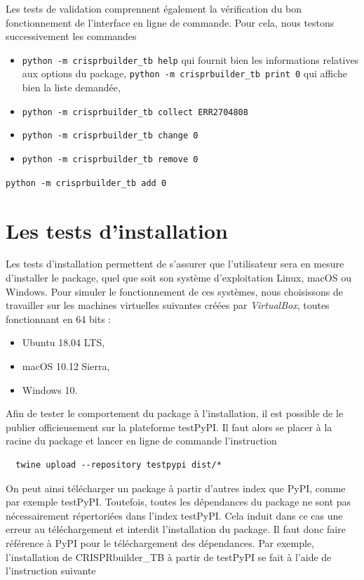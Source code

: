 \documentclass[twoside,a4paper,11pt,frenchb,openany]{report}
\begin{document}
Les tests de validation comprennent également la vérification du bon fonctionnement de l'interface en ligne de commande. Pour cela, nous testons successivement les commandes

\begin{itemize}
\item \texttt{python -m crisprbuilder\_tb \textemdash \textemdash help} qui fournit bien les informations relatives aux options du package,
\texttt{python -m crisprbuilder\_tb \textemdash \textemdash print 0} qui affiche bien la liste demandée,
\item \texttt{python -m crisprbuilder\_tb \textemdash \textemdash collect ERR2704808}
\item \texttt{python -m crisprbuilder\_tb \textemdash \textemdash change 0}
\item \texttt{python -m crisprbuilder\_tb \textemdash \textemdash remove 0}
\end{itemize}
\texttt{python -m crisprbuilder\_tb \textemdash \textemdash add 0}






\section{Les tests d'installation}

Les tests d'installation permettent de s'assurer que l'utilisateur sera en mesure d'installer le package, quel que soit son système d'exploitation Linux, macOS ou Windows. Pour simuler le fonctionnement de ces systèmes, nous choisissons de travailler sur les machines virtuelles suivantes créées par \textit{VirtualBox}, toutes fonctionnant en 64 bits : 
\begin{itemize}
\item Ubuntu 18.04 LTS, 
\item macOS 10.12 Sierra, 
\item Windows 10.
\end{itemize}

Afin de tester le comportement du package à l'installation, il est possible de le publier officieusement sur la plateforme testPyPI. Il faut alors se placer à la racine du package et lancer en ligne de commande l'instruction
\begin{verbatim}  twine upload --repository testpypi dist/*\end{verbatim}

On peut ainsi télécharger un package à partir d'autres index que PyPI, comme par exemple testPyPI. Toutefois, toutes les dépendances du package ne sont pas nécessairement répertoriées dans l'index testPyPI. Cela induit dans ce cas une erreur au téléchargement et interdit l'installation du package. Il faut donc faire référence à PyPI pour le téléchargement des dépendances. Par exemple, l'installation de CRISPRbuilder\_TB à partir de testPyPI se fait à l'aide de l'instruction suivante
\end{document}
